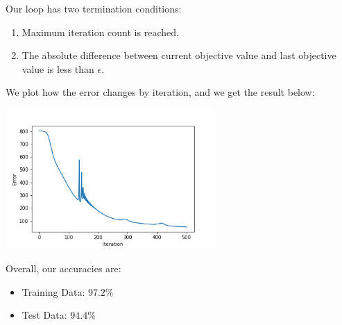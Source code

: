 \documentclass[12pt,reqno]{amsart}
\begin{document}
Our loop has two termination conditions:
\begin{enumerate}
\item Maximum iteration count is reached.
\item The absolute difference between current objective value and last objective value is less than $\epsilon$.
\end{enumerate}

We plot how the error changes by iteration, and we get the result below: \\
\begin{centering}
\includegraphics[width=0.6\textwidth]{test.png}
\end{centering}

Overall, our accuracies are: 
\begin{itemize}
\item Training Data: $97.2\%$
\item Test Data: $94.4\%$
\end{itemize}
\end{document}
